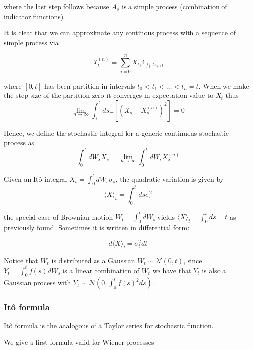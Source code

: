 \documentclass[11pt,a4paper]{article}
\begin{document}
where the last step follows because $A_s$ is a simple process (combination of indicator functions).


It is clear that we can approximate any continous process with a sequence of simple process via

\begin{equation}
    X^{(n)}_t = \sum_{j=0}^{n}X_{t_j}\mathds{1}_{[t_j,t_{j+1})}
\end{equation}

where $[0,t]$ has been partition in intervals $t_0<t_1<\dots <t_n=t$. When we make the step size of the partition zero it converges in expectation value to $X_t$ thus
\begin{equation}
    \lim_{n \to \infty}\int_{0}^tds\mathbb{E}[(X_s-X^{(n)}_s)^2] = 0
\end{equation}

Hence, we define the stochastic integral for a generic  continuous stochastic process as 
\begin{equation}
    \int_{0}^{t} dW_s X_s = \lim_{n \to \infty}\int_{0}^{t} dW_s X^{(n)}_s
\end{equation}

Given an It\^{o} integral $X_t = \int_{0}^tdW_s\sigma_s$, the quadratic variation is given by
\begin{equation}
    \langle X\rangle_t = \int_{0}^tds\sigma^2_s
\end{equation}

the special case of Brownian motion $W_t = \int_{0}^{t}dW_s$ yields $\langle X\rangle_t = \int_{0}^{t}ds = t$ as previously found. Sometimes it is written in differential form:

\begin{equation}
    d\langle X\rangle_t = \sigma^2_t dt 
\end{equation}

Notice that $W_t$ is distributed as a Gaussian $W_t \sim \mathcal{N}(0,t)$, since $Y_t = \int_{0}^tf(s)dW_s$ is a linear combination of $W_t$ we have that $Y_t$ is also  a Gaussian process with $Y_t \sim \mathcal{N}(0, \int_{0}^tf(s)^2ds)$.

\subsubsection{It\^{o} formula}

It\^{o} formula is the analogous of a Taylor series for stochastic function.

We give a first formula valid for Wiener processes
\end{document}
